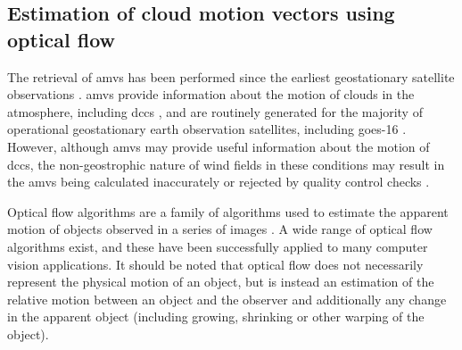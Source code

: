 \subsection{Estimation of cloud motion vectors using optical flow} \label{sec:optical_flow}

The retrieval of \acrshort{amv}s has been performed since the earliest geostationary satellite observations \citep{menzel_cloud_2001}.
\acrshort{amv}s provide information about the motion of clouds in the atmosphere, including \acrshort{dcc}s \citep{bedka_application_2005}, and are routinely generated for the majority of operational geostationary earth observation satellites, including \acrshort{goes}-16 \citep{daniels_algorithm_nodate}. 
However, although \acrshort{amv}s may provide useful information about the motion of \acrshort{dcc}s, the non-geostrophic nature of wind fields in these conditions may result in the \acrshort{amv}s being calculated inaccurately or rejected by quality control checks \citep{bedka_application_2005}.

Optical flow algorithms are a family of algorithms used to estimate the apparent motion of objects observed in a series of images \citep{aggarwal_computation_1988}. 
A wide range of optical flow algorithms exist, and these have been successfully applied to many computer vision applications. 
It should be noted that optical flow does not necessarily represent the physical motion of an object, but is instead an estimation of the relative motion between an object and the observer and additionally any change in the apparent object (including growing, shrinking or other warping of the object). 

